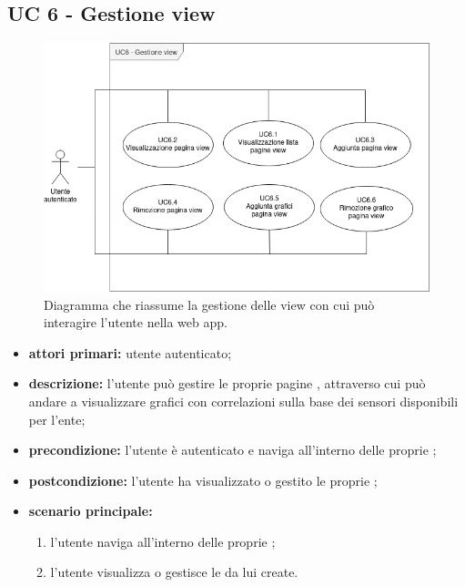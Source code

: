 	\subsection{UC 6 - Gestione view}

		\begin{figure}[H]
			\centering
			\includegraphics[scale=0.60]{res/images/uc6}
			\caption{Diagramma che riassume la gestione delle view con cui può interagire l'utente nella web app.}
		\end{figure}

		\begin{itemize}
			\item \textbf{attori primari:} utente autenticato;
			\item \textbf{descrizione:} l'utente può gestire le proprie pagine , attraverso cui può andare a visualizzare grafici con correlazioni sulla base dei sensori disponibili per l'ente;
			\item \textbf{precondizione:} l'utente è autenticato e naviga all'interno delle proprie ;
			\item \textbf{postcondizione:} l'utente ha visualizzato o gestito le proprie ;
			\item \textbf{scenario principale:}
			\begin{enumerate}
				\item{l'utente naviga all'interno delle proprie ;}
				\item{l'utente visualizza o gestisce le  da lui create.}
			\end{enumerate}
		\end{itemize}

